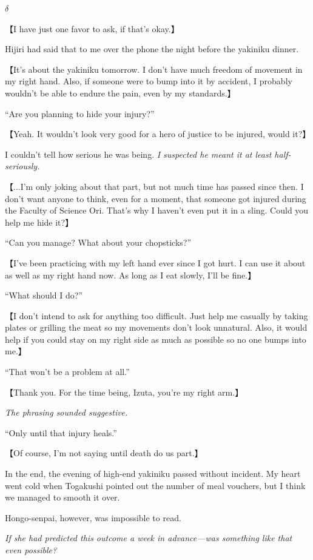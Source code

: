\documentclass[
    a4paper,
    12pt,
    twoside,
    openany,
    UTF8,
    fontset=windows
]{ctexbook}
\begin{document}
$\delta$

【I have just one favor to ask, if that's okay.】

Hijiri had said that to me over the phone the night before the yakiniku dinner.

【It's about the yakiniku tomorrow. I don't have much freedom of movement in my right hand. Also, if someone were to bump into it by accident, I probably wouldn't be able to endure the pain, even by my standards.】

``Are you planning to hide your injury?''

【Yeah. It wouldn't look very good for a hero of justice to be injured, would it?】

I couldn't tell how serious he was being. \textit{I suspected he meant it at least half-seriously.}

【...I'm only joking about that part, but not much time has passed since then. I don't want anyone to think, even for a moment, that someone got injured during the Faculty of Science Ori. That's why I haven't even put it in a sling. Could you help me hide it?】

``Can you manage? What about your chopsticks?''

【I've been practicing with my left hand ever since I got hurt. I can use it about as well as my right hand now. As long as I eat slowly, I'll be fine.】

``What should I do?''

【I don't intend to ask for anything too difficult. Just help me casually by taking plates or grilling the meat so my movements don't look unnatural. Also, it would help if you could stay on my right side as much as possible so no one bumps into me.】

``That won't be a problem at all.''

【Thank you. For the time being, Izuta, you're my right arm.】

\textit{The phrasing sounded suggestive.}

``Only until that injury heals.''

【Of course, I'm not saying until death do us part.】

In the end, the evening of high-end yakiniku passed without incident. My heart went cold when Togakushi pointed out the number of meal vouchers, but I think we managed to smooth it over.

Hongo-senpai, however, was impossible to read.

\textit{If she had predicted this outcome a week in advance---was something like that even possible?}
\end{document}
